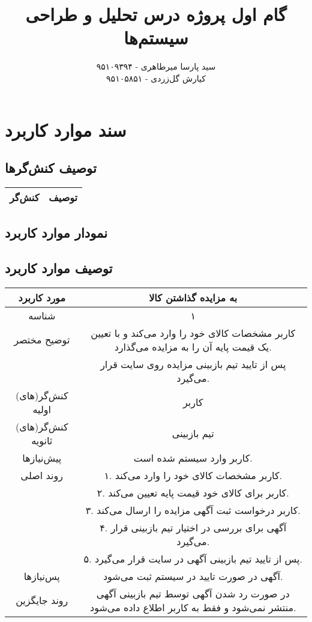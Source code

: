 \documentclass{article}
\title{\textbf{گام اول پروژه درس تحلیل و طراحی سیستم‌ها}}
\author{سید پارسا میرطاهری - ۹۵۱۰۹۳۹۴ \\ کیارش گل‌زردی - ۹۵۱۰۵۸۵۱}
\begin{document}
\date{}

\maketitle

\section{سند موارد کاربرد}

\subsection{توصیف کنش‌گرها}

\begin{center}
\begin{tabular} {| c | c |}
\hline
کنش‌گر & توصیف \\
\hline	
\end{tabular}	
\end{center}


\subsection{نمودار موارد کاربرد}

\subsection{توصیف موارد کاربرد}

\begin{center}
\begin{tabular} { |c|c| }
\hline
 مورد کاربرد & 
 به مزایده گذاشتن کالا
\\ \hline
 شناسه &
۱
\\ \hline
توضیح مختصر &
کاربر مشخصات کالای خود را وارد می‌کند و با تعیین یک قیمت پایه آن را به مزایده می‌گذارد.
\\
&
پس از تایید تیم بازبینی مزایده روی سایت قرار می‌گیرد.
\\ \hline
کنش‌گر(های) اولیه &
کاربر
\\ \hline
کنش‌گر(های) ثانویه &
تیم بازبینی
\\ \hline
پیش‌نیازها &
کاربر وارد سیستم شده است.
\\ \hline
روند اصلی &
۱. کاربر مشخصات کالای خود را وارد می‌کند.
\\
&
۲. کاربر برای کالای خود قیمت پایه تعیین می‌کند.
\\
&
۳. کاربر درخواست ثبت آگهی مزایده را ارسال می‌کند.
\\
&
۴. آگهی برای بررسی در اختیار تیم بازبینی قرار می‌گیرد.
\\
&
۵. پس از تایید تیم بازبینی آگهی در سایت قرار می‌گیرد.
\\ \hline
پس‌نیازها &
آگهی در صورت تایید در سیستم ثبت می‌شود.
\\ \hline
روند جایگزین &
در صورت رد شدن آگهی توسط تیم بازبینی آگهی منتشر نمی‌شود و فقط به کاربر اطلاع داده می‌شود. 
\\ \hline
\end{tabular}
\end{center}
\end{document}
